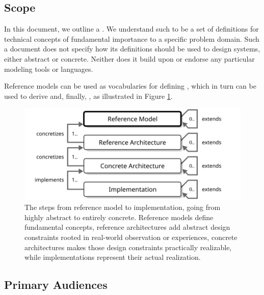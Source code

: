 \subsection{Scope}
\label{sec:introduction:scope}

In this document, we outline a .
We understand such to be a set of definitions for technical concepts of fundamental importance to a specific problem domain.
Such a document does not specify how its definitions should be used to design systems, either abstract or concrete.
Neither does it build upon or endorse any particular modeling tools or languages.

Reference models can be used as vocabularies for defining , which in turn can be used to derive  and, finally, , as illustrated in Figure \ref{fig:reference-model}.

\vspace*{\fill}

\begin{figure}[ht]
  \centering
  \includegraphics{figures/reference-model}
  \caption{
    The steps from reference model to implementation, going from highly abstract to entirely concrete.
    Reference models define fundamental concepts, reference architectures add abstract design constraints rooted in real-world observation or experiences, concrete architectures makes those design constraints practically realizable, while implementations represent their actual realization.
  }
  \label{fig:reference-model}
\end{figure}

\vspace*{\fill}

\newpage

\subsection{Primary Audiences}
\label{sec:introduction:audiences}

